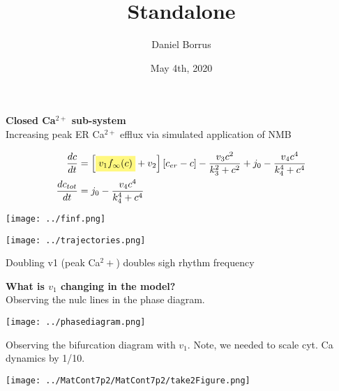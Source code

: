\documentclass[11pt,margin=1cm,varwidth]{standalone}	%
\title{Standalone}
\date{May 4th, 2020}
\author{Daniel Borrus}
\newcommand{\highlight}[1]{%
	\colorbox{yellow!50}{$\displaystyle#1$}}
\begin{document}
	

	{ \bf Closed Ca$^{2+}$ sub-system} \\
	Increasing peak ER Ca$^{2+}$ efflux via simulated application of NMB 

	\begin{center}
	
	\begin{align*}
	\frac{dc}{dt} &= \left[ \highlight{v_1 f_\infty(c)} + v_2 \right] \left[ c_{er} - c \right] - \frac{v_3 c^2}{k^2_3+c^2} + j_0 - \frac{v_4c^4}{k^4_4 + c^4}\\
	\frac{dc_{tot}}{dt} &= j_0 - \frac{v_4c^4}{k^4_4 + c^4}
	\end{align*}
	
	\texttt{[image: ../finf.png]}
	
	\texttt{[image: ../trajectories.png]}



	\end{center}

	Doubling v1 (peak Ca${^2+}$) doubles sigh rhythm frequency
	
	\vskip10mm
	
	{ \bf What is $v_1$ changing in the model?} \\
	Observing the nulc lines in the phase diagram. 
	
	\begin{center}
		\texttt{[image: ../phasediagram.png]}
	\end{center}
	Observing the bifurcation diagram with $v_1$. Note, we needed to scale cyt. Ca dynamics by 1/10.
	\begin{center}
		\texttt{[image: ../MatCont7p2/MatCont7p2/take2Figure.png]}
	
	\end{center}
	
\end{document}

